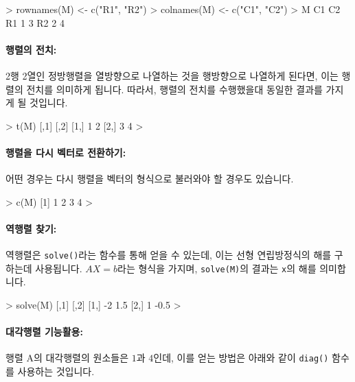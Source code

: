 \documentclass{report}
\begin{document}
\begin{Schunk}
\begin{Soutput}
> rownames(M) <- c("R1", "R2")
> colnames(M) <- c("C1", "C2")
> M
   C1 C2
R1  1  3
R2  2  4
\end{Soutput}
\end{Schunk}

\paragraph{행렬의 전치: }
2행 2열인 정방행렬을 열방향으로 나열하는 것을 행방향으로 나열하게 된다면, 이는 행렬의 전치를 의미하게 됩니다. 
따라서, 행렬의 전치를 수행했을대 동일한 결과를 가지게 될 것입니다. 

\begin{Schunk}
\begin{Soutput}
> t(M)
     [,1] [,2]
[1,]    1    2
[2,]    3    4
> 
\end{Soutput}
\end{Schunk}

\paragraph{행렬을 다시 벡터로 전환하기:}
어떤 경우는 다시 행렬을 벡터의 형식으로 불러와야 할 경우도 있습니다. 

\begin{Schunk}
\begin{Soutput}
> c(M)
[1] 1 2 3 4
> 
\end{Soutput}
\end{Schunk}

\paragraph{역행렬 찾기:} 역행렬은 \texttt{solve()}라는 함수를 통해 얻을 수 있는데, 이는 선형 연립방정식의 해를 구하는데 사용됩니다. 
$AX=b$라는 형식을 가지며, \texttt{solve(M)}의 결과는 \texttt{x}의 해를 의미합니다.

\begin{Schunk}
\begin{Soutput}
> solve(M)
     [,1] [,2]
[1,]   -2  1.5
[2,]    1 -0.5
>
\end{Soutput}
\end{Schunk}

\paragraph{대각행렬 기능활용: } 행렬 A의 대각행렬의 원소들은 $1$과 $4$인데, 이를 얻는 방법은 아래와 같이 \texttt{diag()} 함수를 사용하는 것입니다. 
\end{document}
